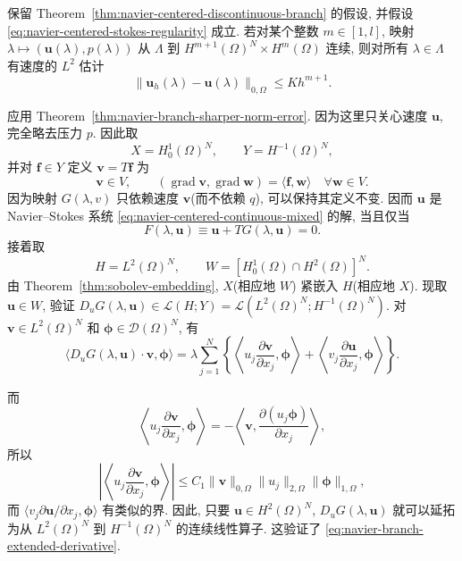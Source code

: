 \setcounter{statement}{1}
\begin{Theorem}\label{thm:navier-centered-discontinuous-l2-error}
保留 Theorem~\ref{thm:navier-centered-discontinuous-branch} 的假设, 并假设
\eqref{eq:navier-centered-stokes-regularity} 成立. 若对某个整数 $m\in[1,l]$,
映射 $\lambda\mapsto(\boldsymbol u(\lambda),p(\lambda))$ 从 $\Lambda$ 到
$H^{m+1}(\Omega)^N\times H^m(\Omega)$ 连续, 则对所有
$\lambda\in\Lambda$ 有速度的 $L^2$ 估计
\begin{equation}\label{eq:navier-centered-discontinuous-l2-error}
\|\boldsymbol u_h(\lambda)-\boldsymbol u(\lambda)\|_{0,\Omega}
\leq Kh^{m+1}.
\end{equation}
\end{Theorem}
\begin{Proof}
应用 Theorem~\ref{thm:navier-branch-sharper-norm-error}. 因为这里只关心速度
$\boldsymbol u$, 完全略去压力 $p$. 因此取
\[
X=H_0^1(\Omega)^N,
\qquad Y=H^{-1}(\Omega)^N,
\]
并对 $\boldsymbol f\in Y$ 定义 $\boldsymbol v=T\boldsymbol f$ 为
\[
\boldsymbol v\in V,
\qquad
(\operatorname{grad}\boldsymbol v,\operatorname{grad}\boldsymbol w)
=\langle\boldsymbol f,\boldsymbol w\rangle
\quad\forall\boldsymbol w\in V.
\]
因为映射 $G(\lambda,v)$ 只依赖速度 $\boldsymbol v$(而不依赖 $q$),
可以保持其定义不变. 因而 $\boldsymbol u$ 是 Navier--Stokes 系统
\eqref{eq:navier-centered-continuous-mixed} 的解, 当且仅当
\[
F(\lambda,\boldsymbol u)
\equiv\boldsymbol u+TG(\lambda,\boldsymbol u)=0.
\]
接着取
\[
H=L^2(\Omega)^N,
\qquad W=[H_0^1(\Omega)\cap H^2(\Omega)]^N.
\]
由 Theorem~\ref{thm:sobolev-embedding}, $X$(相应地 $W$) 紧嵌入 $H$(相应地 $X$).
现取 $\boldsymbol u\in W$, 验证
$D_uG(\lambda,\boldsymbol u)\in\mathcal L(H;Y)
=\mathcal L(L^2(\Omega)^N;H^{-1}(\Omega)^N)$. 对
$\boldsymbol v\in L^2(\Omega)^N$ 和 $\boldsymbol\phi\in\mathcal D(\Omega)^N$,
有
\[
\langle D_uG(\lambda,\boldsymbol u)\cdot\boldsymbol v,
\boldsymbol\phi\rangle
=\lambda\sum_{j=1}^{N}\left\{
\left\langle u_j\frac{\partial\boldsymbol v}{\partial x_j},
\boldsymbol\phi\right\rangle
+\left\langle v_j\frac{\partial\boldsymbol u}{\partial x_j},
\boldsymbol\phi\right\rangle\right\}.
\]

而
\[
\left\langle u_j\frac{\partial\boldsymbol v}{\partial x_j},
\boldsymbol\phi\right\rangle
=-\left\langle\boldsymbol v,
\frac{\partial(u_j\boldsymbol\phi)}{\partial x_j}\right\rangle,
\]
所以
\[
\left|\left\langle u_j\frac{\partial\boldsymbol v}{\partial x_j},
\boldsymbol\phi\right\rangle\right|
\leq C_1\|\boldsymbol v\|_{0,\Omega}
\|u_j\|_{2,\Omega}\|\boldsymbol\phi\|_{1,\Omega},
\]
而 $\langle v_j\partial\boldsymbol u/\partial x_j,\boldsymbol\phi\rangle$
有类似的界. 因此, 只要 $\boldsymbol u\in H^2(\Omega)^N$,
$D_uG(\lambda,\boldsymbol u)$ 就可以延拓为从 $L^2(\Omega)^N$ 到
$H^{-1}(\Omega)^N$ 的连续线性算子. 这验证了
\eqref{eq:navier-branch-extended-derivative}.


\end{Proof}

